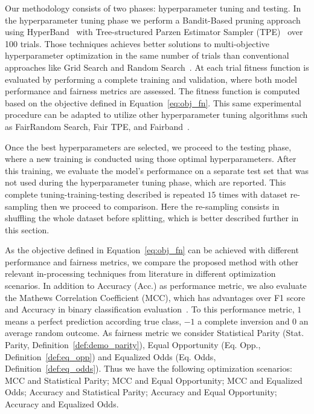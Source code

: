 Our methodology consists of two phases: hyperparameter tuning and testing. In the hyperparameter tuning phase we perform a Bandit-Based pruning approach using HyperBand~\citep{Li2018} with Tree-structured Parzen Estimator Sampler (TPE)~\citep{bergstra2011} over 100 trials. Those techniques achieves better solutions to multi-objective hyperparameter optimization in the same number of trials than conventional approaches like Grid Search and Random Search~\citep{Morales-Hernandez2023}. At each trial fitness function is evaluated by performing a complete training and validation, where both model performance and fairness metrics are assessed. The fitness function is computed based on the objective defined in Equation~\ref{eq:obj_fn}. This same experimental procedure can be adapted to utilize other hyperparameter tuning algorithms such as FairRandom Search, Fair TPE, and Fairband~\citep{Cruz2021}.

Once the best hyperparameters are selected, we proceed to the testing phase, where a new training is conducted using those optimal hyperparameters. After this training, we evaluate the model's performance on a separate test set that was not used during the hyperparameter tuning phase, which are reported. This complete tuning-training-testing described is repeated $15$ times with dataset re-sampling then we proceed to comparison. Here the re-sampling consists in shuffling the whole dataset before splitting, which is better described further in this section.

As the objective defined in Equation~\ref{eq:obj_fn} can be achieved with different performance and fairness metrics, we compare the proposed method with other relevant in-processing techniques from literature in different optimization scenarios. In addition to Accuracy (Acc.) as performance metric, we also evaluate the Mathews Correlation Coefficient (MCC), which has advantages over F1 score and Accuracy in binary classification evaluation~\citep{chicco2020advantages}. To this performance metric, $1$ means a perfect prediction according true class, $-1$ a complete inversion and $0$ an average random outcome. As fairness metric we consider Statistical Parity (Stat. Parity, Definition~\ref{def:demo_parity}), Equal Opportunity (Eq. Opp., Definition~\ref{def:eq_opp}) and Equalized Odds (Eq. Odds, Definition~\ref{def:eq_odds}). Thus we have the following optimization scenarios: MCC and Statistical Parity; MCC and Equal Opportunity; MCC and Equalized Odds; Accuracy and Statistical Parity; Accuracy and Equal Opportunity; Accuracy and Equalized Odds.

